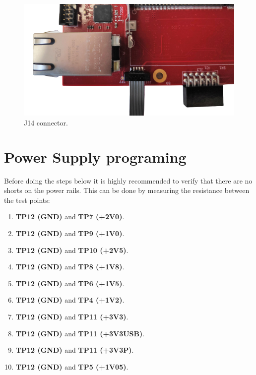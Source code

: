 \documentclass[12pt,oneside,a4]{article}
\begin{document}
\begin{figure}[H]
\begin{center}
\includegraphics[width=0.8\linewidth]{mmcjtag.png}
 \caption{J14 connector. }\label{23}
\end{center}
\end{figure}



\section{Power Supply programing}
Before doing the steps below it is highly recommended to verify that there are no shorts on the power rails. This can be done by measuring the resistance between the test points:

\begin{enumerate}
    \item \textbf{TP12 (GND)} and \textbf{TP7 (+2V0)}.
    \item \textbf{TP12 (GND)} and \textbf{TP9 (+1V0)}.
    \item \textbf{TP12 (GND)} and \textbf{TP10 (+2V5)}.
    \item \textbf{TP12 (GND)} and \textbf{TP8 (+1V8)}.
    \item \textbf{TP12 (GND)} and \textbf{TP6 (+1V5)}.
    \item \textbf{TP12 (GND)} and \textbf{TP4 (+1V2)}.
    \item \textbf{TP12 (GND)} and \textbf{TP11 (+3V3)}.
    \item \textbf{TP12 (GND)} and \textbf{TP11 (+3V3USB)}.
    \item \textbf{TP12 (GND)} and \textbf{TP11 (+3V3P)}.
    \item \textbf{TP12 (GND)} and \textbf{TP5 (+1V05)}.
\end{enumerate}
\end{document}
